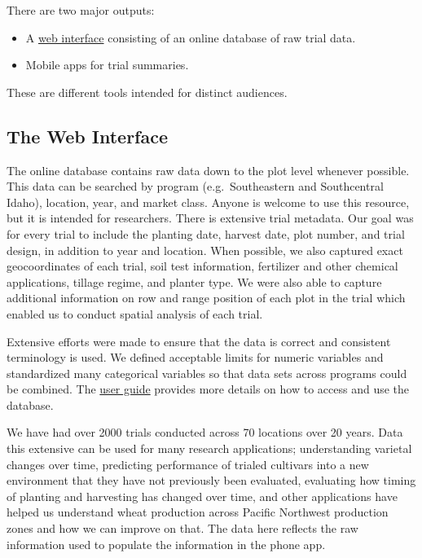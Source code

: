 \documentclass[
  letterpaper,
  DIV=11,
  numbers=noendperiod]{scrreprt}
\begin{document}
There are two major outputs:

\begin{itemize}
\item
  A \href{https://vartestdb.nkn.uidaho.edu/}{web interface} consisting
  of an online database of raw trial data.
\item
  Mobile apps for trial summaries.
\end{itemize}

These are different tools intended for distinct audiences.

\subsection{The Web Interface}\label{the-web-interface}

The online database contains raw data down to the plot level whenever
possible. This data can be searched by program (e.g.~Southeastern and
Southcentral Idaho), location, year, and market class. Anyone is welcome
to use this resource, but it is intended for researchers. There is
extensive trial metadata. Our goal was for every trial to include the
planting date, harvest date, plot number, and trial design, in addition
to year and location. When possible, we also captured exact
geocoordinates of each trial, soil test information, fertilizer and
other chemical applications, tillage regime, and planter type. We were
also able to capture additional information on row and range position of
each plot in the trial which enabled us to conduct spatial analysis of
each trial.

Extensive efforts were made to ensure that the data is correct and
consistent terminology is used. We defined acceptable limits for numeric
variables and standardized many categorical variables so that data sets
across programs could be combined. The
\href{https://vartestdb.nkn.uidaho.edu/user-guide}{user guide} provides
more details on how to access and use the database.

We have had over 2000 trials conducted across 70 locations over 20
years. Data this extensive can be used for many research applications;
understanding varietal changes over time, predicting performance of
trialed cultivars into a new environment that they have not previously
been evaluated, evaluating how timing of planting and harvesting has
changed over time, and other applications have helped us understand
wheat production across Pacific Northwest production zones and how we
can improve on that. The data here reflects the raw information used to
populate the information in the phone app.
\end{document}

